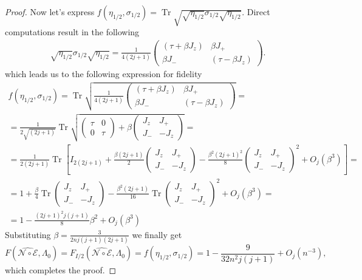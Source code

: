 \documentclass[11pt,letterpaper]{article}
\theoremstyle{plain}
\theoremstyle{plain}
\theoremstyle{plain}
\theoremstyle{plain}
\theoremstyle{plain}
\theoremstyle{plain}
\theoremstyle{plain}
\theoremstyle{definition}
\theoremstyle{plain}
\begin{document}
\begin{proof}
Now let's express 
$
    f(\eta_{1/2},\sigma_{1/2}) = \operatorname{Tr} \sqrt{\sqrt{\eta_{1/2}} \sigma_{1/2} \sqrt{\eta_{1/2}}} .
$
Direct computations result in the following
\[ 
\begin{gathered}
    \sqrt{\eta_{1/2}} \sigma_{1/2} \sqrt{\eta_{1/2}}=\frac{1}{4(2 j+1)}\begin{pmatrix}
\left(\tau+\beta J_z\right) & \beta J_+ \\
\beta J_- & \left(\tau-\beta J_z\right)
    \end{pmatrix}.
 \end{gathered}
\]  
which leads us to the following expression for fidelity
\[
\begin{gathered}
    f(\eta_{1/2},\sigma_{1/2})=\operatorname{Tr} \sqrt{ \frac{1}{4(2 j+1)}\begin{pmatrix}
\left(\tau+\beta J_z\right) & \beta  J_+ \\
\beta  J_- & \left(\tau-\beta J_z\right)
    \end{pmatrix}} =\\
    = \frac{1}{2\sqrt{(2 j+1)}}\operatorname{Tr} \sqrt{ \begin{pmatrix}
\tau & 0 \\
0 & \tau
    \end{pmatrix}+\beta\begin{pmatrix}
J_z & J_+ \\
J_- & -J_z
    \end{pmatrix}}=\\
    =\frac{1}{2 (2j+1)} \operatorname{Tr}\left[I_{2(2j+1)}+\frac{\beta (2j+1)}{2} \begin{pmatrix}
J_z & J_+ \\
J_- & -J_z
    \end{pmatrix}-\frac{\beta^2 (2j+1)^2}{8} \begin{pmatrix}
J_z & J_+ \\
J_- & -J_z
    \end{pmatrix}^2+O_{j}\left(\beta^3\right)\right] =\\ =
    1+\frac{\beta}{4} \operatorname{Tr} \begin{pmatrix}
J_z & J_+ \\
J_- & -J_z
    \end{pmatrix}-\frac{\beta^2 (2j+1)}{16} \operatorname{Tr} \begin{pmatrix}
J_z & J_+ \\
J_- & -J_z
    \end{pmatrix}^2+O_{j}\left(\beta^3\right)=\\=1-\frac{(2 j+1)^2 j(j+1)}{8} \beta^2+O_{j}\left(\beta^3\right)
     \end{gathered}
\]
Substituting $\beta=\frac{3}{2 n j(j+1)(2 j+1)}$ we finally get
\[
     F(\widehat{\mathcal{N} \circ \mathcal{E}}, \Lambda_0)=F_{I/2}(\widehat{\mathcal{N} \circ \mathcal{E}}, \Lambda_0)=f(\eta_{1/2},\sigma_{1/2})=1-\frac{9}{32 n^2 j(j+1)}+O_{j}\left(n^{-3}\right),
\]
which completes the proof.
\end{proof}
\end{document}
